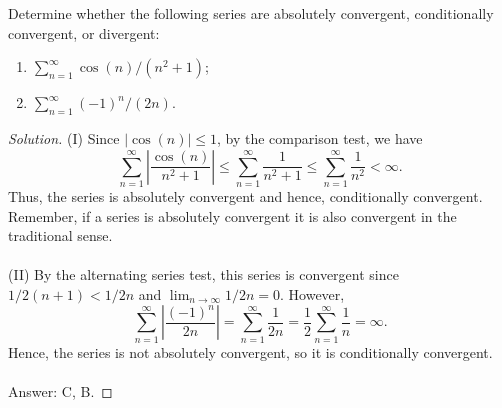 \begin{problem}
Determine whether the following series are absolutely convergent,
conditionally convergent, or divergent:
\begin{enumerate}[label=(\MakeUppercase{\roman*})]
\item $\sum_{n=1}^\infty\cos(n)/(n^2+1)$;
\item $\sum_{n=1}^\infty(-1)^n/(2n)$.
\end{enumerate}
\end{problem}
\begin{proof}[Solution]
(I) Since $|\cos(n)|\leq 1$, by the comparison test, we have
\[
\sum_{n=1}^\infty\left|\frac{\cos(n)}{n^2+1}\right|
\leq\sum_{n=1}^\infty\frac{1}{n^2+1}\leq\sum_{n=1}^\infty\frac{1}{n^2}<\infty.
\]
Thus, the series is absolutely convergent and hence, conditionally
convergent. Remember, if a series is absolutely convergent it is also
convergent in the traditional sense.
\\\\
(II) By the alternating series test, this series is convergent since
$1/2(n+1)<1/2n$ and $\lim_{n\to\infty} 1/2n=0$. However,
\[
\sum_{n=1}^\infty\left|\frac{(-1)^n}{2n}\right|
=\sum_{n=1}^\infty\frac{1}{2n}=\frac{1}{2}\sum_{n=1}^\infty\frac{1}{n}=\infty.
\]
Hence, the series is not absolutely convergent, so it is conditionally
convergent.
\\\\
Answer: {\color{Green}C}, {\color{Red}B}.
\end{proof}

